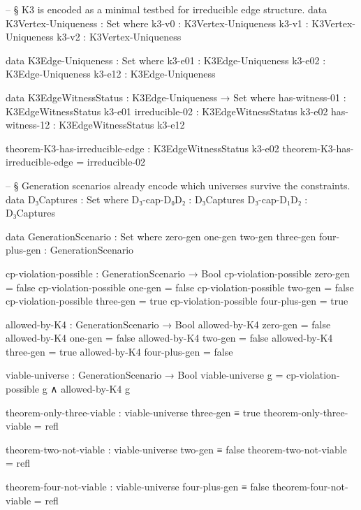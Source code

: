 \documentclass[11pt,a4paper]{book}
\begin{document}
\begin{code}

-- § K3 is encoded as a minimal testbed for irreducible edge structure.
data K3Vertex-Uniqueness : Set where
  k3-v0 : K3Vertex-Uniqueness
  k3-v1 : K3Vertex-Uniqueness
  k3-v2 : K3Vertex-Uniqueness

data K3Edge-Uniqueness : Set where
  k3-e01 : K3Edge-Uniqueness
  k3-e02 : K3Edge-Uniqueness
  k3-e12 : K3Edge-Uniqueness

data K3EdgeWitnessStatus : K3Edge-Uniqueness → Set where
  has-witness-01  : K3EdgeWitnessStatus k3-e01
  irreducible-02  : K3EdgeWitnessStatus k3-e02
  has-witness-12  : K3EdgeWitnessStatus k3-e12

theorem-K3-has-irreducible-edge : K3EdgeWitnessStatus k3-e02
theorem-K3-has-irreducible-edge = irreducible-02

-- § Generation scenarios already encode which universes survive the constraints.
data D₃Captures : Set where
  D₃-cap-D₀D₂ : D₃Captures
  D₃-cap-D₁D₂ : D₃Captures

data GenerationScenario : Set where
  zero-gen one-gen two-gen three-gen four-plus-gen : GenerationScenario

cp-violation-possible : GenerationScenario → Bool
cp-violation-possible zero-gen      = false
cp-violation-possible one-gen       = false
cp-violation-possible two-gen       = false
cp-violation-possible three-gen     = true
cp-violation-possible four-plus-gen = true

allowed-by-K4 : GenerationScenario → Bool
allowed-by-K4 zero-gen      = false
allowed-by-K4 one-gen       = false
allowed-by-K4 two-gen       = false
allowed-by-K4 three-gen     = true
allowed-by-K4 four-plus-gen = false

viable-universe : GenerationScenario → Bool
viable-universe g = cp-violation-possible g ∧ allowed-by-K4 g

theorem-only-three-viable : viable-universe three-gen ≡ true
theorem-only-three-viable = refl

theorem-two-not-viable : viable-universe two-gen ≡ false
theorem-two-not-viable = refl

theorem-four-not-viable : viable-universe four-plus-gen ≡ false
theorem-four-not-viable = refl
\end{code}

\begin{center}
\end{center}
\end{document}
